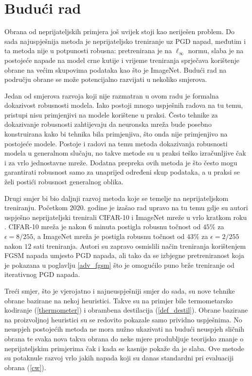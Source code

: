 \documentclass[utf8, diplomski]{fer}
\begin{document}
\section{Budući rad}
Obrana od neprijateljskih primjera još uvijek stoji kao neriješen problem. Do sada najuspješnija metoda je neprijateljsko treniranje uz PGD napad, međutim i ta metoda nije u potpunosti robusna: pretrenirana je na $\ell_{\infty}$ normu, slaba je na postojeće napade na model crne kutije i vrijeme treniranja sprječava korištenje obrane na većim skupovima podataka kao što je ImageNet. Budući rad na području obrane se može potencijalno razvijati u nekoliko smjerova. \par
Jedan od smjerova razvoja koji nije razmatran u ovom radu je formalna dokazivost robusnosti modela. Iako postoji mnogo uspješnih radova na tu temu, pristupi nisu primjenjivi na modele korištene u praksi. Često tehnike za dokazivanje robusnosti zahtijevaju da neuronska mreža bude posebno konstruirana kako bi tehnika bila primjenjiva, što onda nije primjenjivo na postojeće modele. Postoje i radovi na temu metoda dokazivanja robusnosti modela u generalnom slučaju, no takve metode su u praksi teško izračunljive čak i za vrlo jednostavne mreže. Dodatna prepreka ovih metoda je što često mogu garantirati robusnost samo za unaprijed određeni skup podataka, a u praksi se želi postići robusnost generalnog oblika. \par
Drugi smjer bi bio daljnji razvoj metoda koje se temelje na neprijateljskom treniranju. Početkom $2020.$ godine je izašao rad upravo na tu temu gdje su autori uspješno neprijateljski trenirali CIFAR-10 i ImageNet mreže u vrlo kratkom roku \citep{fbf}. CIFAR-10 mreža je nakon $6$ minuta postigla robusnu točnost od $45\%$ za $\epsilon = 8 / 255$, a ImageNet mreža je postigla robusnu točnost od $43\%$ za $\epsilon = 2 / 255$ nakon $12$ sati treniranja. Autori su zapravo osmislili način treniranja korištenjem FGSM napada umjesto PGD napada, ali tako da se izbjegne pretreniranost koja je pokazana u poglavlju \ref{adv_fgsm} što je omogućilo puno brže treniranje od iterativnog PGD napada. \par
Treći smjer, što je vjerojatno i najneuspješniji smjer do sada, su nove tehnike obrane bazirane na nekoj heuristici. Takve su na primjer bile termometarsko kodiranje (\ref{thermometer}) i obrambena destilacija (\ref{def_destil}). Obrane bazirane na proizvoljnoj heuristici su se redovito pokazale samo prividno uspješnima. No neuspjeh postojećih metoda ne mora nužno ukazivati na budući neuspjeh sličnih obrana te svaka nova takva obrana do neke mjere produbljuje teorijsko znanje o neprijateljskim primjerima čak i kada se kasnije pokaže da je slaba. Ove metode su potaknule razvoj vrlo jakih napada koji su danas standardni pri evaluaciji obrana (\ref{cw}). \par
\end{document}
